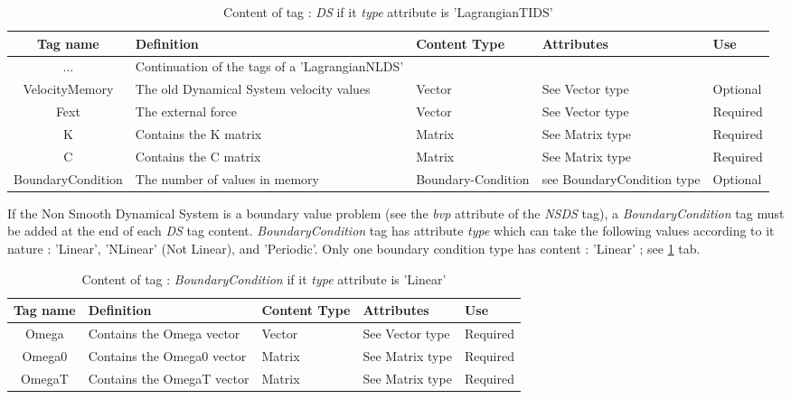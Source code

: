 \begin{table}[!hbp]
\begin{center}
\begin{tabular}{|c|p{4cm}|p{2cm}|p{3cm}|p{2cm}|}
\hline
\bf{Tag name} & \bf{Definition} & \bf{Content Type} & \bf{Attributes} & \bf{Use}
\\\hline
\hline
...	   & Continuation of the tags of a 'LagrangianNLDS' &  &  &	   \\
\hline
VelocityMemory	  & The old Dynamical System velocity values & Vector & See Vector type &  Optional \\
\hline
Fext	     	  &  The external force & Vector & See Vector type &  Required \\
\hline
K		  & Contains the K matrix & Matrix & See Matrix type &  Required \\
\hline
C		  & Contains the C matrix & Matrix & See Matrix type &  Required \\
\hline
BoundaryCondition	  & The number of values in memory & Boundary-Condition & see BoundaryCondition type &  Optional \\
\hline
\end{tabular}
\end{center}
\caption{Content of tag : \textit{DS} if it \textit{type} attribute is 'LagrangianTIDS'}
\end{table}
\clearpage



If the Non Smooth Dynamical System is a boundary value problem (see the \textit{bvp} attribute of the \textit{NSDS} tag), a \textit{BoundaryCondition} tag must be added at the end of each
 \textit{DS} tag content. \textit{BoundaryCondition} tag has attribute \textit{type} which can take the following values according to it nature : 'Linear', 'NLinear' (Not Linear), and 'Periodic'.
Only one boundary condition type has content : 'Linear' ; see \ref{tab-BCL} tab.
 
\begin{table}[!hbp]
\begin{center}
\begin{tabular}{|c|p{6cm}|p{2cm}|p{3cm}|p{2cm}|}
\hline
\bf{Tag name} & \bf{Definition} & \bf{Content Type} & \bf{Attributes} & \bf{Use}
\\\hline
\hline
Omega	          & Contains the Omega vector & Vector & See Vector type &  Required \\
\hline
Omega0	          & Contains the Omega0 vector & Matrix & See Matrix type &  Required \\
\hline
OmegaT	          & Contains the OmegaT vector & Matrix & See Matrix type &  Required \\
\hline
\end{tabular}
\end{center}
\caption{Content of tag : \textit{BoundaryCondition} if it \textit{type} attribute is 'Linear'}
\label{tab-BCL}
\end{table} 
 


